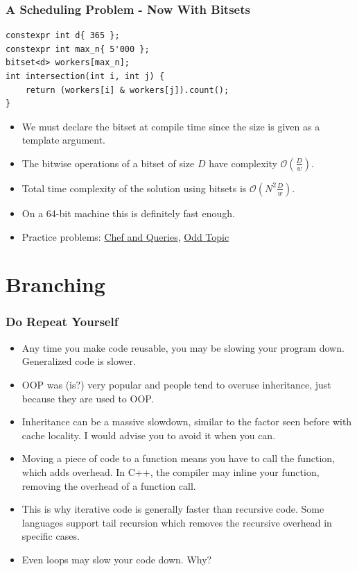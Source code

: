\documentclass[10pt]{beamer}
\begin{document}
\begin{frame}
    \frametitle{A Scheduling Problem - Now With Bitsets}
    \begin{scriptsize}
        \begin{verbatim}
constexpr int d{ 365 };
constexpr int max_n{ 5'000 };
bitset<d> workers[max_n];
int intersection(int i, int j) {
    return (workers[i] & workers[j]).count();
}
        \end{verbatim}
    \end{scriptsize}
    \begin{itemize}
        \item<2-> We must declare the bitset at compile time since the size is given as a template argument.
        \item<3-> The bitwise operations of a bitset of size $D$ have complexity $\mathcal{O}\left(\frac{D}{w}\right)$.
        \item<4-> Total time complexity of the solution using bitsets is $\mathcal{O}\left(N^2 \frac{D}{w}\right)$.
        \item<5-> On a 64-bit machine this is definitely fast enough.
        \item<6-> Practice problems: \href{https://www.codechef.com/problems/CHEFQUE}{Chef and Queries}, \href{https://www.codechef.com/AABH2020/problems/ODTPIC}{Odd Topic}
    \end{itemize}
\end{frame}

\section*{Branching}

\begin{frame}
    \frametitle{Do Repeat Yourself}
    \begin{itemize}
        \item Any time you make code reusable, you may be slowing your program down. Generalized code is slower.
        \item<2-> OOP was (is?) very popular and people tend to overuse inheritance, just because they are used to OOP.
        \item<3-> Inheritance can be a massive slowdown, similar to the factor seen before with cache locality. I would advise you to avoid it when you can.
        \item<4-> Moving a piece of code to a function means you have to call the function, which adds overhead. In C++, the compiler may inline your function, removing the overhead of a function call.
        \item<5-> This is why iterative code is generally faster than recursive code. Some languages support tail recursion which removes the recursive overhead in specific cases.
        \item<6-> Even loops may slow your code down. Why?
    \end{itemize}
\end{frame}
\end{document}
